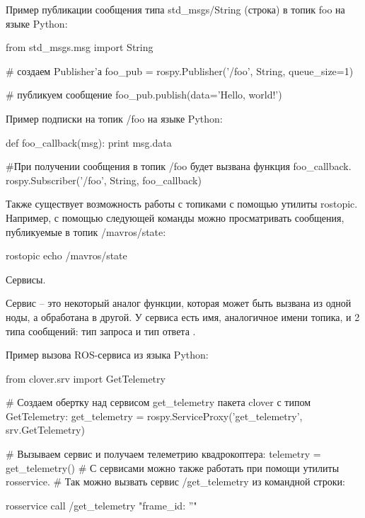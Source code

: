 \begin{Program}[H]
	\caption{Пример публикации сообщения типа std\_msgs/String (строка) в топик foo на языке Python:} \label{lst:2}
	\begin{MyCode}
from std_msgs.msg import String

# создаем Publisher'а
foo_pub = rospy.Publisher('/foo', String, queue_size=1)

# публикуем сообщение
foo_pub.publish(data='Hello, world!')
	\end{MyCode}
\end{Program}
\begin{Program}[H]
	\caption{Пример подписки на топик /foo на языке Python:} \label{lst:3}
	\begin{MyCode}
def foo_callback(msg):
print msg.data

#При получении сообщения в топик /foo будет вызвана функция foo\_callback.
rospy.Subscriber('/foo', String, foo_callback)
	\end{MyCode}
\end{Program}

Также существует возможность работы с топиками с помощью утилиты rostopic. Например, с помощью следующей команды можно просматривать сообщения, публикуемые в топик /mavros/state:

rostopic echo /mavros/state

Сервисы.

Сервис – это некоторый аналог функции, которая может быть вызвана из одной ноды, а обработана в другой. У сервиса есть имя, аналогичное имени топика, и 2 типа сообщений: тип запроса и тип ответа \cite{clover}.

\begin{Program}[H]
	\caption{Пример вызова ROS-сервиса из языка Python:} \label{lst:4}
	\begin{MyCode}
from clover.srv import GetTelemetry

# Создаем обертку над сервисом get\_telemetry пакета clover с типом GetTelemetry:
get_telemetry = rospy.ServiceProxy('get_telemetry', srv.GetTelemetry)

# Вызываем сервис и получаем телеметрию квадрокоптера:
telemetry = get_telemetry()
# С сервисами можно также работать при помощи утилиты rosservice.
# Так можно вызвать сервис /get_telemetry из командной строки:

rosservice call /get\_telemetry "{frame_id: ''}"
	\end{MyCode}
\end{Program}


